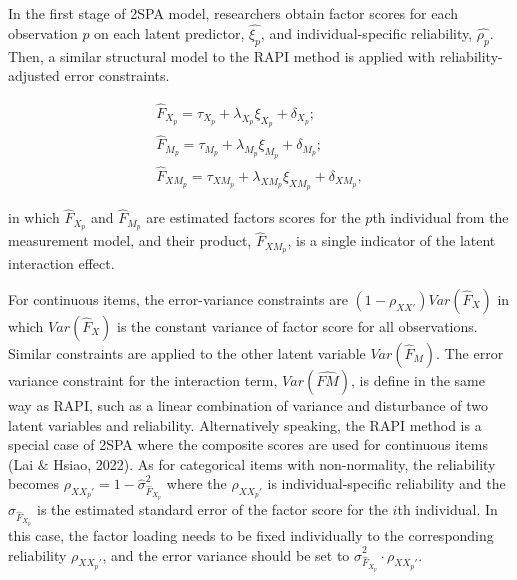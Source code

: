 \documentclass[
  man]{apa7}
\begin{document}
In the first stage of 2SPA model, researchers obtain factor scores for each observation \(p\) on each latent predictor, \(\widehat{\xi_{p}}\), and individual-specific reliability, \(\widehat{\rho_{p}}\). Then, a similar structural model to the RAPI method is applied with reliability-adjusted error constraints.

\begin{equation}
\begin{gathered}
  \widehat{F}_{X_{p}} = \tau_{X_{p}} + \lambda_{X_{p}}\xi_{X_{p}} + \delta_{X_{p}};\\
  \widehat{F}_{M_{p}} = \tau_{M_{p}} + \lambda_{M_{p}}\xi_{M_{p}} + \delta_{M_{p}};\\
  \widehat{F}_{XM_{p}} = \tau_{XM_{p}} + \lambda_{XM_{p}}\xi_{XM_{p}} + \delta_{XM_{p}},
\end{gathered}
\end{equation}

in which \(\widehat{F}_{X_{p}}\) and \(\widehat{F}_{M_{p}}\) are estimated factors scores for the \(p\)th individual from the measurement model, and their product, \(\widehat{F}_{XM_{p}}\), is a single indicator of the latent interaction effect.

For continuous items, the error-variance constraints are \((1 - \rho_{XX'})Var(\widehat{F}_{X})\) in which \(Var(\widehat{F}_{X})\) is the constant variance of factor score for all observations. Similar constraints are applied to the other latent variable \(Var(\widehat{F}_{M})\). The error variance constraint for the interaction term, \(Var(\widehat{FM})\), is define in the same way as RAPI, such as a linear combination of variance and disturbance of two latent variables and reliability. Alternatively speaking, the RAPI method is a special case of 2SPA where the composite scores are used for continuous items (Lai \(\&\) Hsiao, 2022). As for categorical items with non-normality, the reliability becomes \(\rho_{XX_{p}'} = 1 - \widehat{\sigma}_{\widehat{F}_{X_{p}}}^2\) where the \(\rho_{XX_{p}'}\) is individual-specific reliability and the \(\widehat{\sigma}_{\widehat{F}_{X_{p}}}\) is the estimated standard error of the factor score for the \(i\)th individual. In this case, the factor loading needs to be fixed individually to the corresponding reliability \(\rho_{XX_{p}'}\), and the error variance should be set to \(\widehat{\sigma}_{\widehat{F}_{X_{p}}}^2 \cdot \rho_{XX_{p}'}\).
\end{document}
